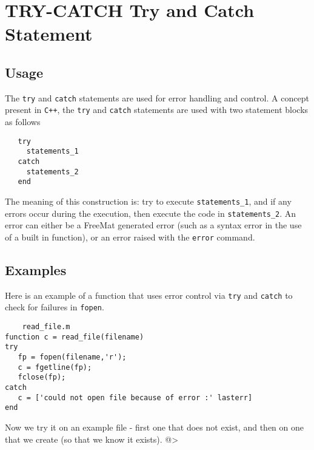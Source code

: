 \section{TRY-CATCH Try and Catch Statement}

\subsection{Usage}

The \verb|try| and \verb|catch| statements are used for error handling
and control.  A concept present in \verb|C++|, the \verb|try| and \verb|catch|
statements are used with two statement blocks as follows
\begin{verbatim}
   try
     statements_1
   catch
     statements_2
   end
\end{verbatim}
The meaning of this construction is: try to execute \verb|statements_1|,
and if any errors occur during the execution, then execute the
code in \verb|statements_2|.  An error can either be a FreeMat generated
error (such as a syntax error in the use of a built in function), or
an error raised with the \verb|error| command.
\subsection{Examples}

Here is an example of a function that uses error control via \verb|try|
and \verb|catch| to check for failures in \verb|fopen|.
\begin{verbatim}
    read_file.m
function c = read_file(filename)
try
   fp = fopen(filename,'r');
   c = fgetline(fp);
   fclose(fp);
catch
   c = ['could not open file because of error :' lasterr]
end
\end{verbatim}
Now we try it on an example file - first one that does not exist,
and then on one that we create (so that we know it exists).
@>
